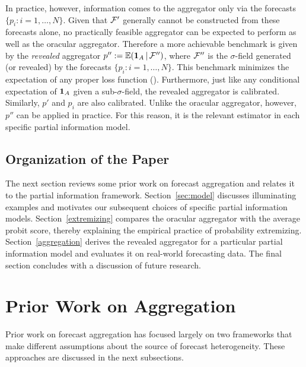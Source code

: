 \documentclass[11pt]{article}
\newcommand{\E}{\mathbb{E}}
\theoremstyle{definition}
\theoremstyle{definition}
\def\one{{\bf 1}}
\def\F{{\cal F}}
\def\E{{\mathbb E}}
\def\|{\, | \,}
\begin{document}
In practice, however, information comes to the
aggregator only via the forecasts $\{p_i : i = 1, \dots, N\}$. Given that $\F'$ generally cannot be constructed from these forecasts alone, no practically feasible aggregator can be expected to perform as well as the oracular aggregator.  Therefore a more achievable benchmark is given by the \textit{revealed} aggregator $p'' := \E (\one_A \|
\F'')$, where $\F''$ is the $\sigma$-field generated (or revealed) by the forecasts
$\{ p_i : i = 1, \dots, N \}$. This benchmark minimizes
the expectation of any proper loss function (\citealt{Ranjan08}). Furthermore, just like any conditional expectation of $\one_A$ given a sub-$\sigma$-field, the revealed aggregator is calibrated. Similarly, $p'$ and $p_i$ are also calibrated. Unlike the oracular aggregator, however, $p''$ can be applied in practice. For this
reason, it is the relevant estimator in each specific partial information model. 


\subsection{Organization of the Paper}

The next section reviews some prior work on forecast aggregation and relates it to the partial information framework.
Section~\ref{sec:model} discusses illuminating examples and
motivates our subsequent choices of specific partial information
models.  Section~\ref{extremizing} compares the oracular aggregator with the average probit score, thereby explaining the
empirical practice of probability extremizing.
Section~\ref{aggregation} derives the revealed aggregator for a
particular partial information model and evaluates it on real-world
forecasting data.  The final section concludes with a discussion of
future research.



\section{Prior Work on Aggregation}
\label{sec:prior}
Prior work on forecast aggregation has focused largely on two frameworks that make different assumptions about the source of forecast heterogeneity.  These approaches are discussed in the next subsections.
\end{document}
